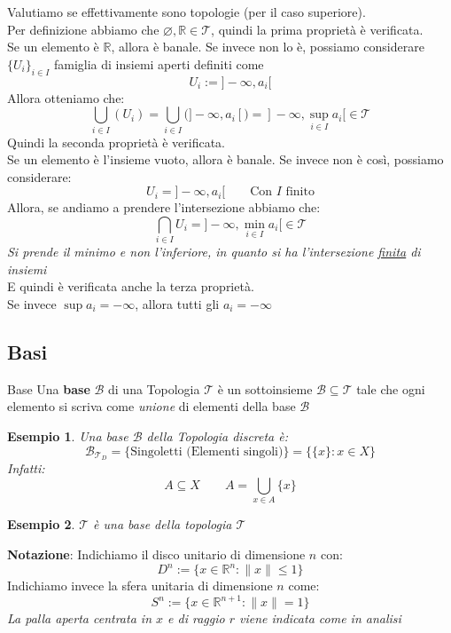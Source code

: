 \documentclass[11pt,a4paper,twoside]{article}
\newtheorem{es}{Esempio}
\theoremstyle{definition}
\begin{document}
Valutiamo se effettivamente sono topologie (per il caso superiore).\\
Per definizione abbiamo che $\varnothing, \mathbb R \in \mathcal T$, quindi la prima proprietà è verificata.\\
Se un elemento è $\mathbb R$, allora è banale. Se invece non lo è, possiamo considerare $\{U_i\}_{i \in I}$ famiglia di insiemi aperti definiti come \[ U_i := ]-\infty, a_i[\]
Allora otteniamo che:
\[ \bigcup_{i \in I}(U_i) = \bigcup_{i \in I}(]-\infty, a_i[) = ]-\infty, \sup_{i \in I}a_i[  \in \mathcal T\]
Quindi la seconda proprietà è verificata.\\
Se un elemento è l'insieme vuoto, allora è banale. Se invece non è così, possiamo considerare:
\[ U_i = ]-\infty, a_i[ \qquad \text{Con }I \text{ finito}\]
Allora, se andiamo a prendere l'intersezione abbiamo che:
\[ \bigcap_{i \in I}U_i = ]-\infty,  \min_{i \in I}a_i[ \in \mathcal T\]
\textit{Si prende il minimo e non l'inferiore, in quanto si ha l'intersezione \underline{finita} di insiemi}\\
E quindi è verificata anche la terza proprietà.\\
Se invece $\sup a_i = -\infty$, allora tutti gli $a_i = -\infty$


\subsection{Basi}
\begin{defn}{Base}{}
	Una \textbf{base} $\mathcal B$ di una Topologia $\mathcal T$ è un sottoinsieme $\mathcal B \subseteq\mathcal T$ tale che ogni elemento si scriva come \textit{unione} di elementi della base $\mathcal B$
\end{defn}

\begin{es}
	Una base $\mathcal B$ della Topologia discreta è:
	\[ \mathcal B_{\mathcal T_D} = \{\text{Singoletti (Elementi singoli)}\} = \{\{x\}: x \in X\}\]
	Infatti: \[A \subseteq X \qquad A = \bigcup_{x \in A}\{x\}\]
\end{es}

\begin{es}
	$\mathcal T$ è una base della topologia $\mathcal T$
\end{es}

\textbf{Notazione}: Indichiamo il disco unitario di dimensione $n$ con:
\[ D^n := \{x \in \mathbb R^n : \|x\|\leq 1\} \]
Indichiamo invece la sfera unitaria di dimensione $n$ come:
\[ S^n := \{x \in \mathbb R^{n+1} : \|x\| = 1\}\]
\textit{La palla aperta centrata in $x$ e di raggio $r$ viene indicata come in analisi}
\end{document}
